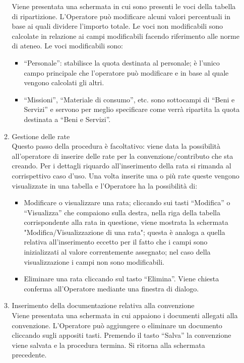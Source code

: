 \begin{enumerate}
\begin{enumerate}
      Viene presentata una schermata in cui sono presenti le voci della tabella di ripartizione. L'Operatore può modificare alcuni valori percentuali 
      in base ai quali dividere l'importo totale. Le voci non modificabili sono calcolate in relazione ai campi modificabili facendo riferimento alle norme di ateneo. Le voci modificabili sono:
      \begin{itemize}
	\item ``Personale'': stabilisce la quota destinata al personale; è l'unico campo principale che l'operatore può modificare e in base al quale vengono calcolati gli altri.
	\item ``Missioni'', ``Materiale di consumo'', etc. sono sottocampi di ``Beni e Servizi'' e servono per meglio specificare come verrà ripartita la quota destinata a ``Beni e Servizi''.
      \end{itemize}
    \item Gestione delle rate\\
      
      Questo passo della procedura è facoltativo: viene data la possibilità all'operatore di inserire delle rate per la convenzione/contributo
      che sta creando. Per i dettagli riquardo all'inserimento della rata si rimanda al corrispettivo caso d'uso. Una volta inserite una o più rate
      queste vengono visualizzate in una tabella e l'Operatore
      ha la possibilità di:
      \begin{itemize}
       \item  Modificare o visualizzare una rata; cliccando sui tasti ``Modifica'' o ``Visualizza'' che compaiono sulla destra, nella riga della tabella
       corrispondente alla rata in questione, viene mostrata la schermata "Modifica/Visualizzazione di una rata"; questa è analoga a quella relativa all'inserimento
       eccetto per il fatto che i campi	sono inizializzati al valore correntemente assegnato; nel caso della visualizzazione i campi non sono modificabili.
			
	\item Eliminare una rata cliccando sul tasto ``Elimina''. Viene chiesta conferma all'Operatore mediante una finestra di dialogo.

      \end{itemize}

      
    \item Inserimento della documentazione relativa alla convenzione\\
	  
	  Viene presentata una schermata in cui appaiono i documenti allegati alla convenzione. L'Operatore può aggiungere o eliminare un documento 
	  cliccando sugli appositi tasti. Premendo il tasto ``Salva'' la convenzione viene salvata e la procedura termina. Si ritorna alla schermata precedente.
  \end{enumerate}
		 

\end{enumerate}
